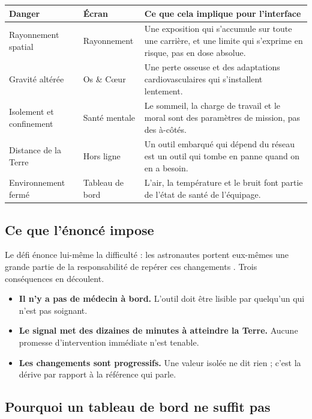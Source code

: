\documentclass[11pt,a4paper]{article}
\begin{document}
\begin{tabularx}{\textwidth}{@{}L{4.0cm} L{4.3cm} X@{}}
\toprule
\textbf{Danger} & \textbf{\'Ecran} & \textbf{Ce que cela implique pour l'interface} \\
\midrule
Rayonnement spatial & Rayonnement & Une exposition qui s'accumule sur toute une carri\`ere, et une limite qui s'exprime en risque, pas en dose absolue. \\
Gravit\'e alt\'er\'ee & Os \& C\oe{}ur & Une perte osseuse et des adaptations cardiovasculaires qui s'installent lentement. \\
Isolement et confinement & Sant\'e mentale & Le sommeil, la charge de travail et le moral sont des param\`etres de mission, pas des \`a-c\^ot\'es. \\
Distance de la Terre & Hors ligne & Un outil embarqu\'e qui d\'epend du r\'eseau est un outil qui tombe en panne quand on en a besoin. \\
Environnement ferm\'e & Tableau de bord & L'air, la temp\'erature et le bruit font partie de l'\'etat de sant\'e de l'\'equipage. \\
\bottomrule
\end{tabularx}

\subsection{Ce que l'\'enonc\'e impose}

Le d\'efi \'enonce lui-m\^eme la difficult\'e : \og les astronautes portent eux-m\^emes une grande
partie de la responsabilit\'e de rep\'erer ces changements \fg{}. Trois cons\'equences en d\'ecoulent.

\begin{itemize}
  \item \textbf{Il n'y a pas de m\'edecin \`a bord.} L'outil doit \^etre lisible par quelqu'un qui
        n'est pas soignant.
  \item \textbf{Le signal met des dizaines de minutes \`a atteindre la Terre.} Aucune promesse
        d'intervention imm\'ediate n'est tenable.
  \item \textbf{Les changements sont progressifs.} Une valeur isol\'ee ne dit rien ; c'est la d\'erive
        par rapport \`a la r\'ef\'erence qui parle.
\end{itemize}

\subsection{Pourquoi un tableau de bord ne suffit pas}
\end{document}
